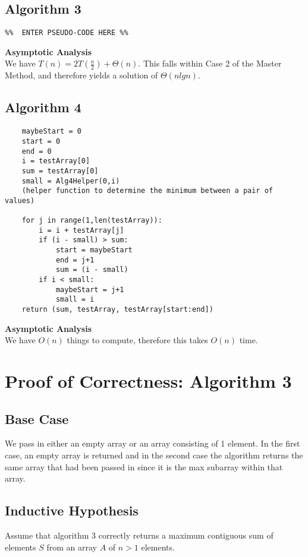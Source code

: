 \documentclass[11pt,letterpaper]{article}
\begin{document}
\subsection{Algorithm 3}
\begin{verbatim}
%%  ENTER PSEUDO-CODE HERE %%
\end{verbatim}
\textbf{Asymptotic Analysis}\\
We have $T(n) = 2T(\frac{n}{2}) + \Theta(n)$. This falls within Case 2 of the Master Method, and therefore yields a solution of $\Theta(nlgn)$.

\subsection{Algorithm 4}
\begin{verbatim}
    maybeStart = 0
    start = 0
    end = 0
    i = testArray[0]
    sum = testArray[0]
    small = Alg4Helper(0,i) 
    (helper function to determine the minimum between a pair of values)

    for j in range(1,len(testArray)):
        i = i + testArray[j]
        if (i - small) > sum:
            start = maybeStart
            end = j+1
            sum = (i - small)
        if i < small:
            maybeStart = j+1
            small = i
    return (sum, testArray, testArray[start:end])
\end{verbatim}
\textbf{Asymptotic Analysis}\\
We have $O(n)$ things to compute, therefore this takes $O(n)$ time.


\section{Proof of Correctness: Algorithm 3}
\subsection*{Base Case}
We pass in either an empty array or an array consisting of 1 element. In the first case, an empty array is returned and in the second case the algorithm returns the same array that had been passed in since it is the max subarray within that array.

\subsection*{Inductive Hypothesis}
Assume that algorithm 3 correctly returns a maximum contiguous sum of elements $S$ from an array $A$ of $n > 1$ elements. 
\end{document}
